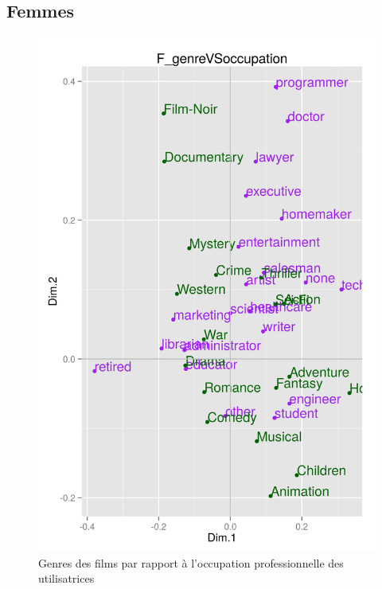 \documentclass[11pt]{article}
\begin{document}
\subsection{Femmes}
\begin{figure}[htd]
\centering
\includegraphics[scale=0.65]{./images/F_genreVSoccupation}
\caption{Genres des films par rapport à l'occupation professionnelle des utilisatrices}
\end{figure}

\pagebreak
\end{document}
